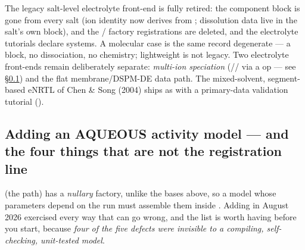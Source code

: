 \documentclass[11pt,a4paper]{article}
\begin{document}
The legacy salt-level electrolyte front-end is fully retired: the
 component block is gone from every salt 
(ion identity now derives from ; dissolution data live in
the salt's own  block),  and the
/ factory registrations are deleted,
and the electrolyte tutorials declare  systems.
A molecular case is the same record degenerate --- a  block,
no dissociation, no chemistry; lightweight is not legacy.  Two
electrolyte front-ends remain deliberately separate: \emph{multi-ion
speciation} (// via a
  op --- see
\S\ref{sec:add-aqueous-model}) and the flat membrane/DSPM-DE data path.  The
mixed-solvent, segment-based eNRTL of Chen \& Song (2004) ships as
 with a primary-data validation tutorial
().

\subsection{Adding an AQUEOUS activity model --- and the four things that
are not the registration line}\label{sec:add-aqueous-model}

 (the  path) has a \emph{nullary}
factory, unlike the  bases above, so a model whose
parameters depend on the run must assemble them inside .
Adding  in August 2026 exercised every way that can go
wrong, and the list is worth having before you start, because \emph{four of
the five defects were invisible to a compiling, self-checking, unit-tested
model}.
\end{document}

